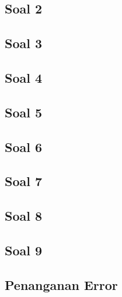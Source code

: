 \subsection{Soal 2}
	
\subsection{Soal 3}
	
\subsection{Soal 4}
	
\subsection{Soal 5}
	
\subsection{Soal 6}
	
\subsection{Soal 7}
	
\subsection{Soal 8}
	
\subsection{Soal 9}
	
\subsection{Penanganan Error}
	
	
